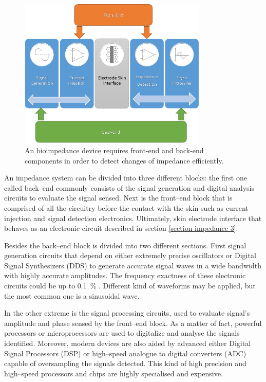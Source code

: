 \begin{figure}[!htpb]
	\centering
	\includegraphics[width=9cm,keepaspectratio]{figure11}    
	\caption[Block diagram of a common bioimpedance device]{An bioimpedance device requires front-end and back-end components in order to detect changes of impedance efficiently.}
	\label{fig:block diagram bioimpedance}
\end{figure}

An impedance system can be divided into three different blocks: the first one called back–end commonly consists of the signal generation and digital analysis circuits to evaluate the signal sensed. Next is the front–end block that is comprised of all the circuitry before the contact with the skin such as current injection and signal detection electronics. Ultimately, skin electrode interface that behaves as an electronic circuit described in section \ref{section impedance 3}. 

Besides the back–end block is divided into two different sections. First signal generation circuits that depend on either extremely precise oscillators or Digital Signal Synthesizers (DDS) to generate accurate signal waves in a wide bandwidth with highly accurate amplitudes. The frequency exactness of these electronic circuits could be up to \SI{0.1}{\percent} \cite{ad:AD5930}.  Different kind of waveforms may be applied, but the most common one is a sinusoidal wave. 

In the other extreme is the signal processing circuits, used to evaluate signal’s amplitude and phase sensed by the front–end block.  As a matter of fact, powerful processors or microprocessors are used to digitalize and analyse the signals identified. Moreover, modern devices are also aided by advanced either Digital Signal Processors (DSP) or high–speed analogue to digital converters (ADC) capable of oversampling the signals detected. This kind of high precision and high–speed processors and chips are highly specialised and expensive.

